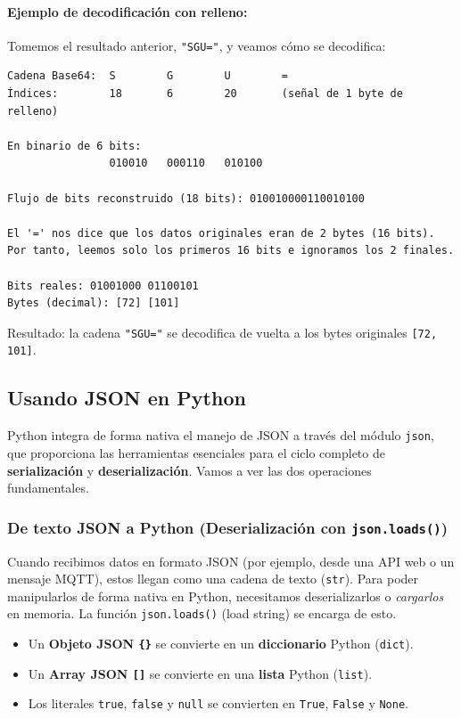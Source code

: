 \newpage

\paragraph{Ejemplo de decodificación con relleno:}
Tomemos el resultado anterior, \texttt{"SGU="}, y veamos cómo se decodifica:

\begin{lstlisting}[basicstyle=\ttfamily\small]
Cadena Base64:  S        G        U        =
Índices:        18       6        20       (señal de 1 byte de relleno)

En binario de 6 bits:
                010010   000110   010100

Flujo de bits reconstruido (18 bits): 010010000110010100

El '=' nos dice que los datos originales eran de 2 bytes (16 bits).
Por tanto, leemos solo los primeros 16 bits e ignoramos los 2 finales.

Bits reales: 01001000 01100101
Bytes (decimal): [72] [101]
\end{lstlisting}

Resultado: la cadena \texttt{"SGU="} se decodifica de vuelta a los bytes originales \texttt{[72, 101]}.

\subsection{Usando JSON en Python}

Python integra de forma nativa el manejo de JSON a través del módulo \texttt{json}, que proporciona las herramientas esenciales para el ciclo completo de \textbf{serialización} y \textbf{deserialización}. Vamos a ver las dos operaciones fundamentales.

\subsubsection{De texto JSON a Python (Deserialización con \texttt{json.loads()})}

Cuando recibimos datos en formato JSON (por ejemplo, desde una API web o un mensaje MQTT), estos llegan como una cadena de texto (\texttt{str}). Para poder manipularlos de forma nativa en Python, necesitamos deserializarlos o \textit{cargarlos} en memoria. La función \texttt{json.loads()} (load string) se encarga de esto.

\begin{itemize}
    \item Un \textbf{Objeto JSON \texttt{\{\}}} se convierte en un \textbf{diccionario} Python (\texttt{dict}).
    \item Un \textbf{Array JSON \texttt{[]}} se convierte en una \textbf{lista} Python (\texttt{list}).
    \item Los literales \texttt{true}, \texttt{false} y \texttt{null} se convierten en \texttt{True}, \texttt{False} y \texttt{None}.
\end{itemize}

